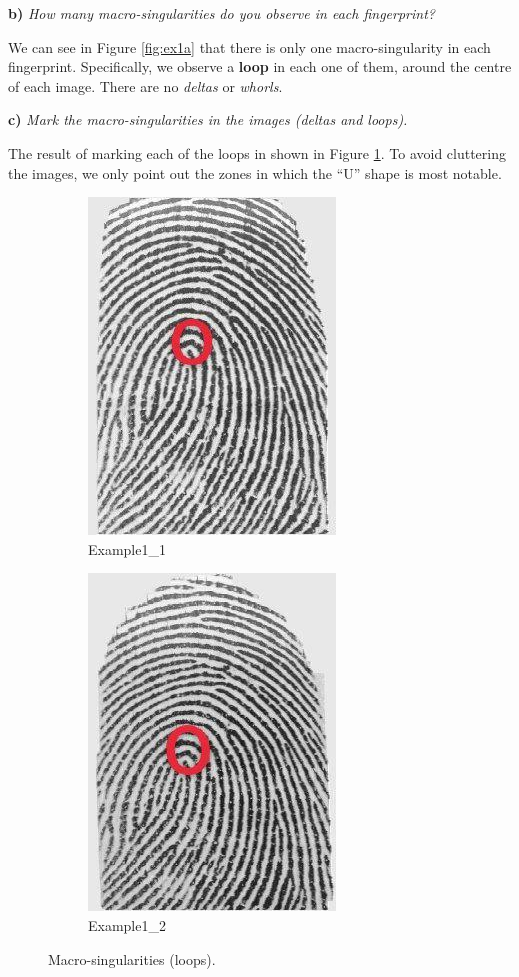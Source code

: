 \documentclass[11pt]{article}
\begin{document}
\textbf{b) } \emph{How many macro-singularities do you observe in each fingerprint?}

We can see in Figure \ref{fig:ex1a} that there is only one macro-singularity in each fingerprint. Specifically, we observe a \textbf{loop} in each one of them, around the centre of each image. There are no \textit{deltas} or \textit{whorls}.

\textbf{c) } \emph{Mark the macro-singularities in the images (deltas and loops).}

The result of marking each of the loops in shown in Figure \ref{fig:ex1c}. To avoid cluttering the images, we only point out the zones in which the ``U'' shape is most notable.

\begin{figure}[h!]
  \centering
       \begin{subfigure}[t]{0.45\textwidth}
         \centering
         \includegraphics[scale=0.6]{img/msing_1.jpg}
         \caption{Example1\_1}
     \end{subfigure}%
     \quad
     \begin{subfigure}[t]{0.45\textwidth}
         \centering
         \includegraphics[scale=0.6]{img/msing_2.jpg}
         \caption{Example1\_2}
     \end{subfigure}
    \caption{Macro-singularities (loops).}
    \label{fig:ex1c}
\end{figure}
\end{document}
